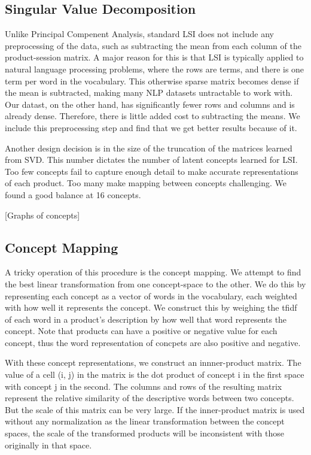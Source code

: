 \documentclass[11pt]{article}
\begin{document}
\subsection*{Singular Value Decomposition}
Unlike Principal Compenent Analysis, standard LSI does not include any
preprocessing of the data, such as subtracting the mean from each column of the
product-session matrix. A major reason for this is that LSI is typically applied
to natural language processing problems, where the rows are terms, and there is
one term per word in the vocabulary. This otherwise sparse matrix becomes dense
if the mean is subtracted, making many NLP datasets untractable to work with. 
Our datast, on the other hand, has significantly fewer rows and columns and is
already dense. Therefore, there is little added cost to subtracting the
means. We include this preprocessing step and find that we get better results
because of it.

Another design decision is in the size of the truncation of the matrices learned
from SVD. This number dictates the number of latent concepts learned for LSI.
Too few concepts fail to capture enough detail to make accurate representations
of each product. Too many make mapping between concepts challenging. We found a
good balance at 16 concepts. 

[Graphs of concepts]

\subsection*{Concept Mapping}
A tricky operation of this procedure is the concept mapping. We attempt to find
the best linear transformation from one concept-space to the other. We do this
by representing each concept as a vector of words in the vocabulary, each
weighted with how well it represents the concept. We construct this by weighing
the tfidf of each word in a product's description by how well that word
represents the concept. Note that products can have a positive or negative value
for each concept, thus the word representation of concpets are also positive and
negative. 

With these concept representations, we construct an innner-product matrix. The 
value of a cell (i, j) in the matrix is the dot product of concept i in the first 
space with concept j in the second. The columns and rows of the resulting matrix
represent the relative similarity of the descriptive words between two concepts.
But the scale of this matrix can be very large. If the inner-product matrix is
used without any normalization as the linear transformation between the concept
spaces, the scale of the transformed products will be inconsistent with those
originally in that space. 
\end{document}
